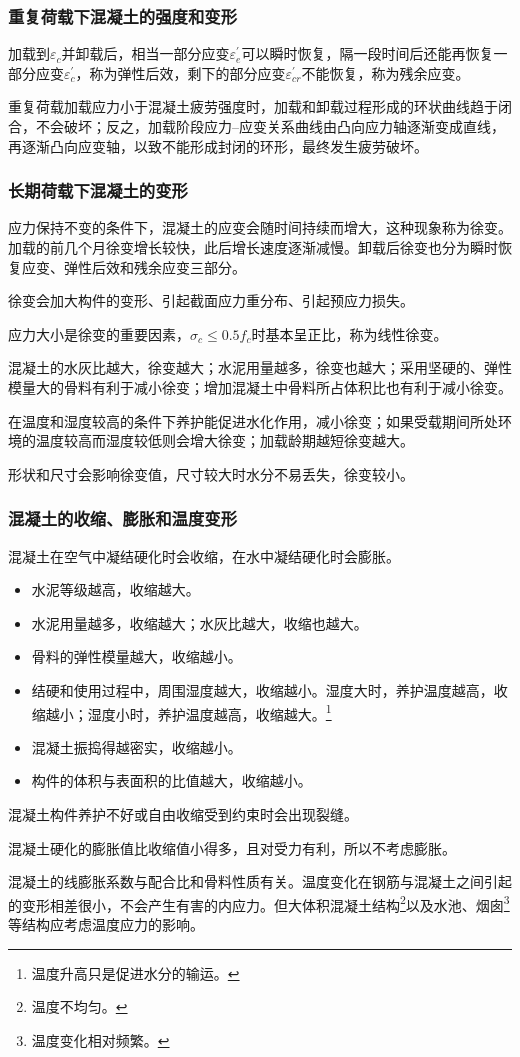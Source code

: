 \documentclass{article}
\begin{document}
\subsubsection{重复荷载下混凝土的强度和变形}
\par 加载到$\varepsilon_c$并卸载后，相当一部分应变$\varepsilon_e^{\prime}$可以瞬时恢复，隔一段时间后还能再恢复一部分应变$\varepsilon_c^{\prime}$，称为弹性后效，剩下的部分应变$\varepsilon_{cr}^{\prime}$不能恢复，称为残余应变。
\par 重复荷载加载应力小于混凝土疲劳强度时，加载和卸载过程形成的环状曲线趋于闭合，不会破坏；反之，加载阶段应力--应变关系曲线由凸向应力轴逐渐变成直线，再逐渐凸向应变轴，以致不能形成封闭的环形，最终发生疲劳破坏。
\subsubsection{长期荷载下混凝土的变形}
\par 应力保持不变的条件下，混凝土的应变会随时间持续而增大，这种现象称为徐变。加载的前几个月徐变增长较快，此后增长速度逐渐减慢。卸载后徐变也分为瞬时恢复应变、弹性后效和残余应变三部分。
\par 徐变会加大构件的变形、引起截面应力重分布、引起预应力损失。
\par 应力大小是徐变的重要因素，$\sigma_c\leq0.5f_c$时基本呈正比，称为线性徐变。
\par 混凝土的水灰比越大，徐变越大；水泥用量越多，徐变也越大；采用坚硬的、弹性模量大的骨料有利于减小徐变；增加混凝土中骨料所占体积比也有利于减小徐变。
\par 在温度和湿度较高的条件下养护能促进水化作用，减小徐变；如果受载期间所处环境的温度较高而湿度较低则会增大徐变；加载龄期越短徐变越大。
\par 形状和尺寸会影响徐变值，尺寸较大时水分不易丢失，徐变较小。
\subsubsection{混凝土的收缩、膨胀和温度变形}
\par 混凝土在空气中凝结硬化时会收缩，在水中凝结硬化时会膨胀。
\begin{itemize}
      \item 水泥等级越高，收缩越大。
      \item 水泥用量越多，收缩越大；水灰比越大，收缩也越大。
      \item 骨料的弹性模量越大，收缩越小。
      \item 结硬和使用过程中，周围湿度越大，收缩越小。湿度大时，养护温度越高，收缩越小；湿度小时，养护温度越高，收缩越大。\footnote{温度升高只是促进水分的输运。}
      \item 混凝土振捣得越密实，收缩越小。
      \item 构件的体积与表面积的比值越大，收缩越小。
\end{itemize}
\par 混凝土构件养护不好或自由收缩受到约束时会出现裂缝。
\par 混凝土硬化的膨胀值比收缩值小得多，且对受力有利，所以不考虑膨胀。
\par 混凝土的线膨胀系数与配合比和骨料性质有关。温度变化在钢筋与混凝土之间引起的变形相差很小，不会产生有害的内应力。但大体积混凝土结构\footnote{温度不均匀。}以及水池、烟囱\footnote{温度变化相对频繁。}等结构应考虑温度应力的影响。
\end{document}
